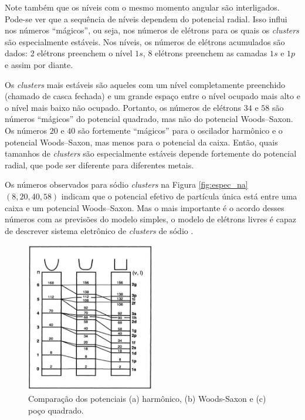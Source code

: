  Note também que os níveis com o mesmo momento angular são interligados. Pode-se ver que a sequência de níveis dependem do potencial radial. Isso influi nos números “mágicos”, ou seja, nos números de elétrons para os quais os \textit{clusters} são especialmente estáveis. Nos níveis, os números de elétrons acumulados são dados: 2 elétrons preenchem o nível $1s$, 8 elétrons preenchem as camadas $1s$ e $1p$ e assim por diante.
 
 Os \textit{clusters} mais estáveis são aqueles com um nível completamente preenchido (chamado de casca fechada) e um grande espaço entre o nível ocupado mais alto e o nível mais baixo não ocupado. Portanto, os números de elétrons $34$ e $58$ são números “mágicos” do potencial quadrado, mas não do potencial Woods–Saxon. Os números $20$ e $40$ são fortemente “mágicos” para o oscilador harmônico e o potencial Woods–Saxon, mas menos para o potencial da caixa. Então, quais tamanhos de \textit{clusters} são especialmente estáveis depende fortemente do potencial radial, que pode ser diferente para diferentes metais.
 
Os números observados para sódio
\textit{clusters} na Figura \ref{fig:espec_na} $(8, 20, 40, 58)$ indicam que o potencial efetivo de partícula única está entre uma caixa e um potencial Woods–Saxon. Mas o mais importante é o acordo desses números com as previsões do modelo simples, o modelo de elétrons livres é capaz de descrever sistema eletrônico de \textit{clusters} de sódio \cite{livro_Clusters_Fullerenes}.

\begin{figure}
  \centering
  \includegraphics[width=0.5\textwidth]{images/clusters/pocos}
  \caption{Comparação dos potenciais (a) harmônico, (b) Woods-Saxon e (c) poço quadrado. \cite{Heer}}
  \label{fig:pocos}
\end{figure}

